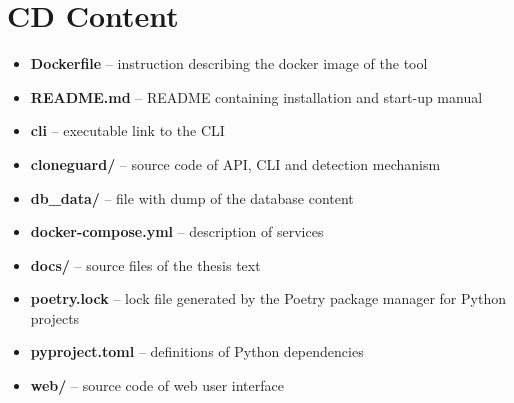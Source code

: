 
\chapter{CD Content}

\begin{itemize}
    \item \textbf{Dockerfile} -- instruction describing the docker image of the tool
    \item \textbf{README.md} -- README containing installation and start-up manual
    \item \textbf{cli} -- executable link to the CLI
    \item \textbf{cloneguard/} -- source code of API, CLI and detection mechanism
    \item \textbf{db\_data/} -- file with dump of the database content
    \item \textbf{docker-compose.yml} -- description of services
    \item \textbf{docs/} -- source files of the thesis text
    \item \textbf{poetry.lock} -- lock file generated by the Poetry package manager for Python projects
    \item \textbf{pyproject.toml} -- definitions of Python dependencies
    \item \textbf{web/} -- source code of web user interface
\end{itemize}
